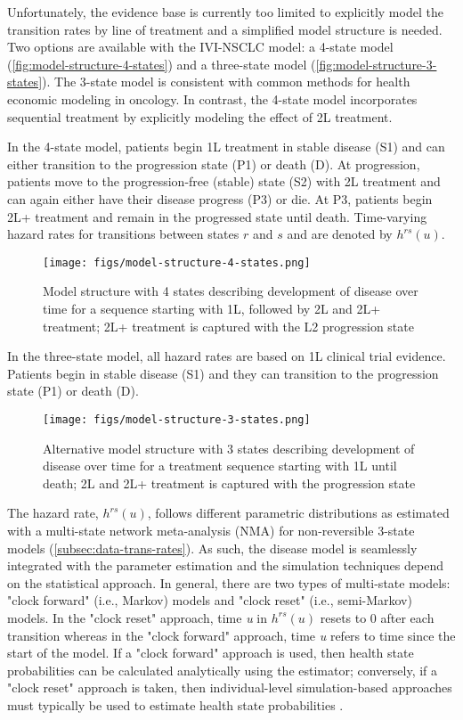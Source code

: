 \documentclass[11pt,final,fleqn]{article}\usepackage[]{graphicx}\usepackage[]{color}
\theoremstyle{plain}
\begin{document}
{Unfortunately, the evidence base is currently too limited to explicitly model the transition rates by line of treatment and a simplified model structure is needed. Two options are available with the IVI-NSCLC model: a 4-state model (\autoref{fig:model-structure-4-states}) and a three-state model (\autoref{fig:model-structure-3-states}). The 3-state model is consistent with common methods for health economic modeling in oncology. In contrast, the 4-state model incorporates sequential treatment by explicitly modeling the effect of 2L treatment.  

In the 4-state model, patients begin 1L treatment in stable disease (S1) and can either transition to the progression state (P1) or death (D). At progression, patients move to the progression-free (stable) state (S2) with 2L treatment and can again either have their disease progress (P3) or die. At P3, patients begin 2L+ treatment and remain in the progressed state until death. Time-varying hazard rates for transitions between states $r$ and $s$ and are denoted by $h^{rs}(u)$.

\begin{figure}
\centering
\texttt{[image: figs/model-structure-4-states.png]}
\caption{Model structure with 4 states describing development of disease over time for a sequence starting with 1L, followed by 2L and 2L+ treatment; 2L+ treatment is captured with the L2 progression state}\label{fig:model-structure-4-states}
\end{figure}

In the three-state model, all hazard rates are based on 1L clinical trial evidence. Patients begin in stable disease (S1) and they can transition to the progression state (P1) or death (D).

\begin{figure}
\centering
\texttt{[image: figs/model-structure-3-states.png]}
\caption{Alternative model structure with 3 states describing development of disease over time for a treatment sequence starting with 1L until death; 2L and 2L+ treatment is captured with the progression state}\label{fig:model-structure-3-states} 
\end{figure}

The hazard rate, $h^{rs}(u)$, follows different parametric distributions as estimated with a multi-state network meta-analysis (NMA) for non-reversible 3-state models (\autoref{subsec:data-trans-rates}). As such, the disease model is seamlessly integrated with the parameter estimation and the simulation techniques  depend on the statistical approach. In general, there are two types of multi-state models: "clock forward" (i.e., Markov) models and "clock reset" (i.e., semi-Markov) models. In the "clock reset" approach, time \textit{u} in $h^{rs}(u)$ resets to 0 after each transition whereas in the "clock forward" approach, time \textit{u} refers to time since the start of the model. If a "clock forward" approach is used, then health state probabilities can be calculated analytically using the \citet{aalen1978empirical} estimator; conversely, if a "clock reset" approach is taken, then individual-level simulation-based approaches must typically be used to estimate health state probabilities \citep{putter2007tutorial, de2011mstate, jackson2016flexsurv}. 

}
\end{document}
